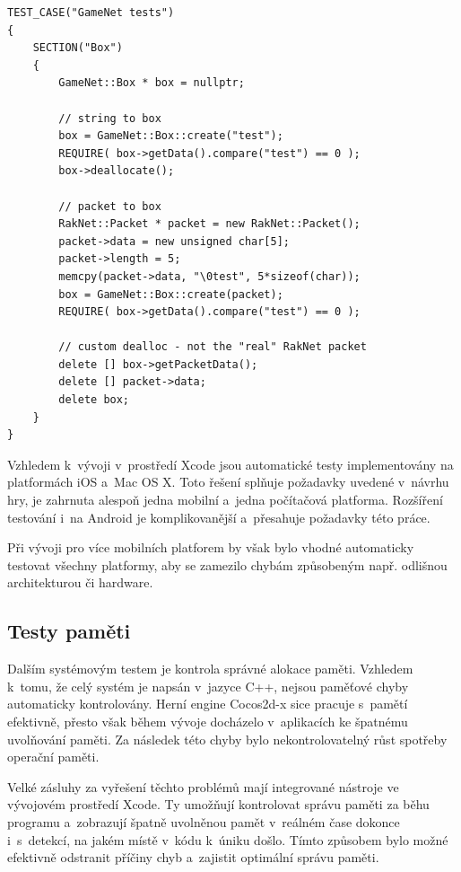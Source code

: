 \documentclass[thesis=B,czech,hidelinks]{FITthesis}[2012/06/26] %
\begin{document}
\begin{verbatim}
TEST_CASE("GameNet tests")
{
    SECTION("Box") 
    { 
        GameNet::Box * box = nullptr;
        
        // string to box
        box = GameNet::Box::create("test");
        REQUIRE( box->getData().compare("test") == 0 );
        box->deallocate();
        
        // packet to box
        RakNet::Packet * packet = new RakNet::Packet();
        packet->data = new unsigned char[5];
        packet->length = 5;
        memcpy(packet->data, "\0test", 5*sizeof(char));
        box = GameNet::Box::create(packet);
        REQUIRE( box->getData().compare("test") == 0 );
		
        // custom dealloc - not the "real" RakNet packet
        delete [] box->getPacketData();
        delete [] packet->data;
        delete box;
    }
}
\end{verbatim}

Vzhledem k~vývoji v~prostředí Xcode jsou automatické testy implementovány na platformách iOS a~Mac OS X. Toto řešení splňuje požadavky uvedené v~návrhu hry, je zahrnuta alespoň jedna mobilní a~jedna počítačová platforma. Rozšíření testování i~na Android je komplikovanější a~přesahuje požadavky této práce.

Při vývoji pro více mobilních platforem by však bylo vhodné automaticky testovat všechny platformy, aby se zamezilo chybám způsobeným např. odlišnou architekturou či hardware.

\subsection{Testy paměti}

Dalším systémovým testem je kontrola správné alokace paměti. Vzhledem k~tomu, že celý systém je napsán v~jazyce C++, nejsou paměťové chyby automaticky kontrolovány. Herní engine Cocos2d-x sice pracuje s~pamětí efektivně, přesto však během vývoje docházelo v~aplikacích ke špatnému uvolňování paměti. Za následek této chyby bylo nekontrolovatelný růst spotřeby operační paměti.

Velké zásluhy za vyřešení těchto problémů mají integrované nástroje ve vývojovém prostředí Xcode. Ty umožňují kontrolovat správu paměti za běhu programu a~zobrazují špatně uvolněnou pamět v~reálném čase dokonce i~s~detekcí, na jakém místě v~kódu k~úniku došlo. Tímto způsobem bylo možné efektivně odstranit příčiny chyb a~zajistit optimální správu paměti.
\end{document}
